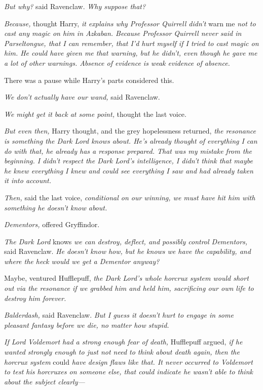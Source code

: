 \emph{But why?} said Ravenclaw. \emph{Why suppose that?}

\emph{Because,} thought Harry, \emph{it explains why Professor Quirrell didn't}
warn me \emph{not to cast any magic on him in Azkaban. Because Professor
Quirrell never said in Parseltongue, that I can remember, that I'd hurt myself
if I tried to cast magic on him. He could have given me that warning, but he
didn't, even though he gave me a lot of other warnings. Absence of evidence is
weak evidence of absence.}

There was a pause while Harry's parts considered this.

\emph{We don't actually have our wand,} said Ravenclaw.

\emph{We might get it back at some point,} thought the last voice.

\emph{But even then,} Harry thought, and the grey hopelessness returned,
\emph{the resonance is something the Dark Lord knows about. He's already
thought of everything I can do with that, he already has a response prepared.
That was my mistake from the beginning. I didn't respect the Dark Lord's
intelligence, I didn't think that maybe he knew everything I knew and could see
everything I saw and had already taken it into account.}

\emph{Then,} said the last voice, \emph{conditional on our winning, we must
have hit him with something he doesn't know about.}

\emph{Dementors,} offered Gryffindor.

\emph{The Dark Lord} knows \emph{we can destroy, deflect, and possibly control
Dementors,} said Ravenclaw. \emph{He doesn't know how, but he knows we have the
capability, and where the heck would we get a Dementor anyway?}

Maybe, ventured Hufflepuff, \emph{the Dark Lord's whole horcrux system would
short out via the resonance if we grabbed him and held him, sacrificing our own
life to destroy him forever.}

\emph{Balderdash,} said Ravenclaw. \emph{But I guess it doesn't hurt to engage
in some pleasant fantasy before we die, no matter how stupid.}

\emph{If Lord Voldemort had a strong enough fear of death,} Hufflepuff argued,
\emph{if he wanted strongly enough to just not need to think about death again,
then the horcrux system} could \emph{have design flaws like that. It never
occurred to Voldemort to test his horcruxes on someone else, that could
indicate he wasn't able to think about the subject clearly---}

